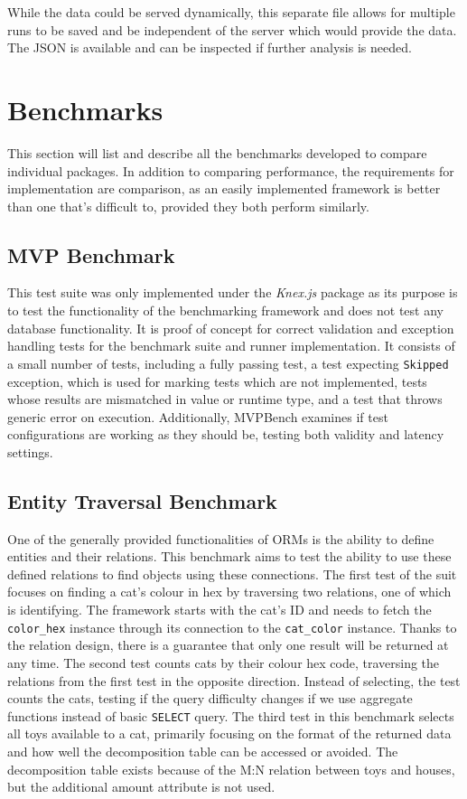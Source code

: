 While the data could be served dynamically, this separate file allows for
multiple runs to be saved and be independent of the server which would provide
the data. The JSON is available and can be inspected if further analysis is
needed.

\section{Benchmarks}
This section will list and describe all the benchmarks developed to compare
individual packages. In addition to comparing performance, the requirements for
implementation are comparison, as an easily implemented framework is better than
one that's difficult to, provided they both perform similarly.

\subsection{MVP Benchmark}
This test suite was only implemented under the \textit{Knex.js} package as its
purpose is to test the functionality of the benchmarking framework and does not
test any database functionality. It is proof of concept for correct validation
and exception handling tests for the benchmark suite and runner implementation.
It consists of a small number of tests, including a fully passing test, a test
expecting \texttt{Skipped} exception, which is used for marking tests which are
not implemented, tests whose results are mismatched in value or runtime type,
and a test that throws generic error on execution. Additionally, MVPBench
examines if test configurations are working as they should be, testing both
validity and latency settings.

\subsection{Entity Traversal Benchmark}
One of the generally provided functionalities of ORMs is the ability to define
entities and their relations. This benchmark aims to test the ability to use
these defined relations to find objects using these connections. The first test
of the suit focuses on finding a cat's colour in hex by traversing two
relations, one of which is identifying. The framework starts with the cat's ID
and needs to fetch the \texttt{color\_hex} instance through its connection to
the \texttt{cat\_color} instance. Thanks to the relation design, there is a
guarantee that only one result will be returned at any time. The second test
counts cats by their colour hex code, traversing the relations from the first
test in the opposite direction. Instead of selecting, the test counts the cats,
testing if the query difficulty changes if we use aggregate functions instead of
basic \texttt{SELECT} query. The third test in this benchmark selects all toys
available to a cat, primarily focusing on the format of the returned data and
how well the decomposition table can be accessed or avoided. The decomposition
table exists because of the M:N relation between toys and houses, but the
additional amount attribute is not used.

